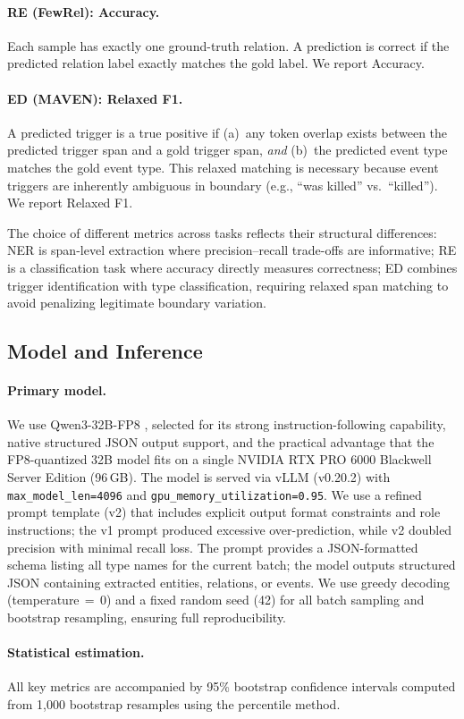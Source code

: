 \paragraph{RE (FewRel): Accuracy.}
Each sample has exactly one ground-truth relation. A prediction is correct if the predicted relation label exactly matches the gold label. We report Accuracy.

\paragraph{ED (MAVEN): Relaxed F1.}
A predicted trigger is a true positive if (a)~any token overlap exists between the predicted trigger span and a gold trigger span, \emph{and} (b)~the predicted event type matches the gold event type. This relaxed matching is necessary because event triggers are inherently ambiguous in boundary (e.g., ``was killed'' vs.\ ``killed''). We report Relaxed F1.

The choice of different metrics across tasks reflects their structural differences: NER is span-level extraction where precision--recall trade-offs are informative; RE is a classification task where accuracy directly measures correctness; ED combines trigger identification with type classification, requiring relaxed span matching to avoid penalizing legitimate boundary variation.

\subsection{Model and Inference}
\label{sec:model}

\paragraph{Primary model.}
We use Qwen3-32B-FP8 \cite{qwen3-2025}, selected for its strong instruction-following capability, native structured JSON output support, and the practical advantage that the FP8-quantized 32B model fits on a single NVIDIA RTX PRO 6000 Blackwell Server Edition (96\,GB). The model is served via vLLM (v0.20.2) \cite{vllm-2023} with \texttt{max\_model\_len=4096} and \texttt{gpu\_memory\_utilization=0.95}. We use a refined prompt template (v2) that includes explicit output format constraints and role instructions; the v1 prompt produced excessive over-prediction, while v2 doubled precision with minimal recall loss. The prompt provides a JSON-formatted schema listing all type names for the current batch; the model outputs structured JSON containing extracted entities, relations, or events. We use greedy decoding (temperature${}\,=\,0$) and a fixed random seed (42) for all batch sampling and bootstrap resampling, ensuring full reproducibility.

\paragraph{Statistical estimation.}
All key metrics are accompanied by 95\% bootstrap confidence intervals computed from 1{,}000 bootstrap resamples using the percentile method.
